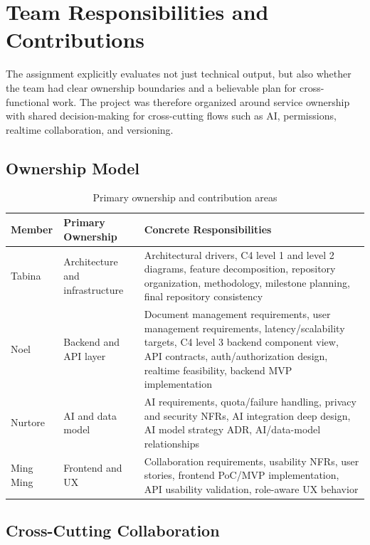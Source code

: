 \chapter{Team Responsibilities and Contributions}

The assignment explicitly evaluates not just technical output, but also whether the team had clear
ownership boundaries and a believable plan for cross-functional work. The project was therefore
organized around service ownership with shared decision-making for cross-cutting flows such as AI,
permissions, realtime collaboration, and versioning.

\section{Ownership Model}

\begin{table}[H]
\centering
\caption{Primary ownership and contribution areas}
\label{tab:ownership}
\begin{tabularx}{\textwidth}{p{2.4cm}p{4.4cm}X}
\toprule
\textbf{Member} & \textbf{Primary Ownership} & \textbf{Concrete Responsibilities} \\
\midrule
Tabina & Architecture and infrastructure & Architectural drivers, C4 level 1 and level 2 diagrams, feature decomposition, repository organization, methodology, milestone planning, final repository consistency \\
Noel & Backend and API layer & Document management requirements, user management requirements, latency/scalability targets, C4 level 3 backend component view, API contracts, auth/authorization design, realtime feasibility, backend MVP implementation \\
Nurtore & AI and data model & AI requirements, quota/failure handling, privacy and security NFRs, AI integration deep design, AI model strategy ADR, AI/data-model relationships \\
Ming Ming & Frontend and UX & Collaboration requirements, usability NFRs, user stories, frontend PoC/MVP implementation, API usability validation, role-aware UX behavior \\
\bottomrule
\end{tabularx}
\end{table}

\section{Cross-Cutting Collaboration}

